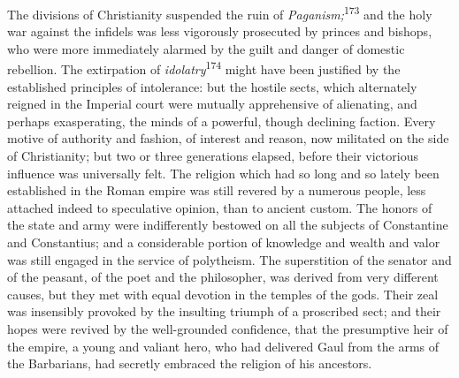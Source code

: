 The divisions of Christianity suspended the ruin of \textit{Paganism;}\textsuperscript{173}
and the holy war against the infidels was less vigorously
prosecuted by princes and bishops, who were more immediately
alarmed by the guilt and danger of domestic rebellion. The
extirpation of \textit{idolatry}\textsuperscript{174} might have been justified by the
established principles of intolerance: but the hostile sects,
which alternately reigned in the Imperial court were mutually
apprehensive of alienating, and perhaps exasperating, the minds
of a powerful, though declining faction. Every motive of
authority and fashion, of interest and reason, now militated on
the side of Christianity; but two or three generations elapsed,
before their victorious influence was universally felt. The
religion which had so long and so lately been established in the
Roman empire was still revered by a numerous people, less
attached indeed to speculative opinion, than to ancient custom.
The honors of the state and army were indifferently bestowed on
all the subjects of Constantine and Constantius; and a
considerable portion of knowledge and wealth and valor was still
engaged in the service of polytheism. The superstition of the
senator and of the peasant, of the poet and the philosopher, was
derived from very different causes, but they met with equal
devotion in the temples of the gods. Their zeal was insensibly
provoked by the insulting triumph of a proscribed sect; and their
hopes were revived by the well-grounded confidence, that the
presumptive heir of the empire, a young and valiant hero, who had
delivered Gaul from the arms of the Barbarians, had secretly
embraced the religion of his ancestors.


